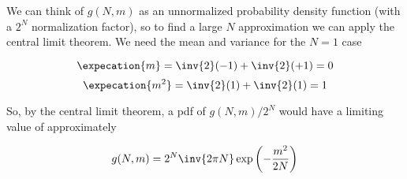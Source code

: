 {We can think of $g(N, m)$ as an unnormalized probability density function (with a $2^N$ normalization factor), so to find a large $N$ approximation we can apply the central limit theorem.  We need the mean and variance for the $N = 1$ case

\begin{equation}\label{eqn:basicStatMechProblemSet3Problem3:n}
\expecation{m} = \inv{2}(-1) + \inv{2}(+1) = 0
\end{equation}
\begin{equation}\label{eqn:basicStatMechProblemSet3Problem3:n}
\expecation{m^2} = \inv{2}(1) + \inv{2}(1) = 1
\end{equation}

So, by the central limit theorem, a pdf of $g(N, m)/2^N$ would have a limiting value of approximately

\begin{equation}\label{eqn:basicStatMechProblemSet3Problem3:n}
g(N, m) = 2^N \inv{2 \pi N} \exp\left( - \frac{ m^2 }{2 N } \right)
\end{equation}

%
}
